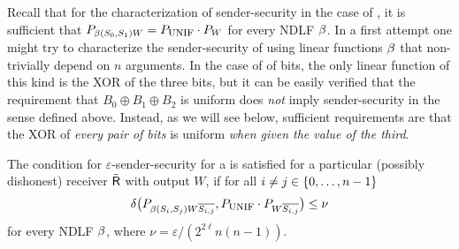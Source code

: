 Recall that for the characterization of sender-security in the case of
\OT, it is sufficient that $P_{\beta(S_0,S_1) W} = P_{\mbox{\sc unif}} \cdot
P_{W}$ for every  NDLF $\beta$.
In a first attempt one might try to characterize the sender-security
of \onenOT using linear functions $\beta$ that non-trivially depend on
$n$ arguments. In the case of \onethreeOT of bits, the only linear
function of this kind is the XOR of the three bits, but it can be
easily verified that the requirement that $B_0 \oplus B_1 \oplus B_2$
is uniform does \emph{not} imply sender-security in the sense defined
above. Instead, as we will see below, sufficient requirements are that
the XOR of \emph{every pair of bits} is uniform {\em when given the
  value of the third}.

\begin{theorem}\label{thm:onen}
  The condition for $\varepsilon$-sender-security  for a \onenRandlStringOT 
  is satisfied for a particular (possibly dishonest) receiver $\tilde{\sf R}$
  with output $W$, if 
for all $i\neq j \in \{0,\ldots,n-1\}$ 
$$
\delta\big( P_{\beta(S_i,S_j) W \overline{S_{i,j}}} , P_{\mbox{\sc unif}} \cdot P_{W
    \overline{S_{i,j}}} \big) \leq \nu 
$$
for every NDLF $\beta$, where $\nu = \varepsilon/(2^{2\ell}n(n-1))$. 
\end{theorem}
